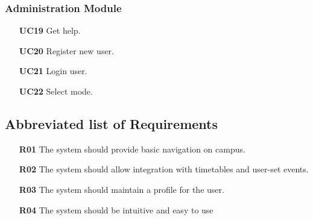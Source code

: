 \documentclass[12pt,a4paper]{article}
\begin{document}
			\subsubsection{Administration Module}

				\begin{itemize}
					\item [\textbf{UC19}] Get help.
					\item [\textbf{UC20}] Register new user.
					\item [\textbf{UC21}] Login user.
					\item [\textbf{UC22}] Select mode.

				\end{itemize}

		\subsection{Abbreviated list of Requirements}

			\begin{itemize}
				\item [\textbf{R01}] The system should provide basic navigation on campus.
				\item [\textbf{R02}] The system should allow integration with timetables and user-set events.
				\item [\textbf{R03}] The system should maintain a profile for the user.
				\item [\textbf{R04}] The system should be intuitive and easy to use
			\end{itemize}
\end{document}
